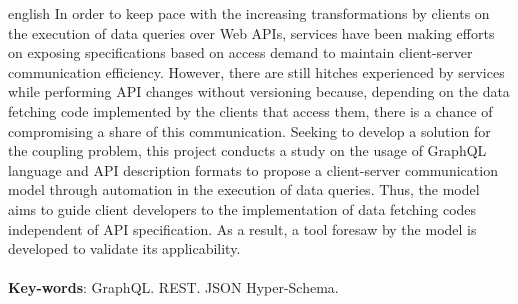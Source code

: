 \begin{resumo}[Abstract]
  \begin{otherlanguage*}{english}
    In order to keep pace with the increasing transformations by clients on the execution of data queries over Web APIs, services have been making efforts on exposing specifications based on access demand to maintain client-server communication efficiency. However, there are still hitches experienced by services while performing API changes without versioning because, depending on the data fetching code implemented by the clients that access them, there is a chance of compromising a share of this communication. Seeking to develop a solution for the coupling problem, this project conducts a study on the usage of GraphQL language and API description formats to propose a client-server communication model through automation in the execution of data queries. Thus, the model aims to guide client developers to the implementation of data fetching codes independent of API specification. As a result, a tool foresaw by the model is developed to validate its applicability. \\ \\
    \textbf{Key-words}: GraphQL. REST. JSON Hyper-Schema.
  \end{otherlanguage*}
\end{resumo}
